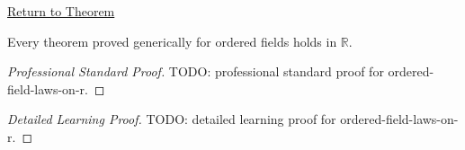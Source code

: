 \newpage
{}
\label{prf:ordered-field-laws-on-r}

\begin{remark*}[Return]
\hyperref[cor:ordered-field-laws-on-r]{Return to Theorem}
\end{remark*}

\begin{corollary*}
Every theorem proved generically for ordered fields holds in $\mathbb{R}$.
\end{corollary*}

\begin{proof}[Professional Standard Proof]
\LRAProofBodyStart
TODO: professional standard proof for ordered-field-laws-on-r.
\end{proof}

\begin{proof}[Detailed Learning Proof]
\LRAProofBodyStart
TODO: detailed learning proof for ordered-field-laws-on-r.
\end{proof}

\begin{remark*}
\end{remark*}

\NoLocalDependencies

\clearpage
